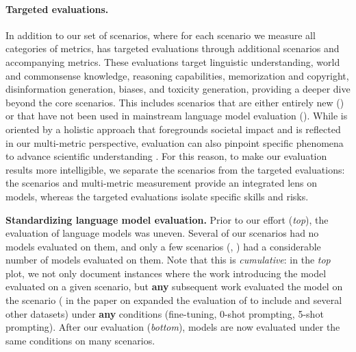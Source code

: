 \paragraph{Targeted evaluations.}
In addition to our \core set of \numcorescenarios scenarios, where for each scenario we measure all \nummetriccategories categories of metrics, \benchmarkname has \numcomponents targeted evaluations through \numcomponentscenarios additional scenarios and accompanying metrics.
These evaluations target linguistic understanding, world and commonsense knowledge, reasoning capabilities, memorization and copyright, disinformation generation, biases, and toxicity generation, providing a deeper dive beyond the core scenarios.
This includes \numnewscenarios scenarios that are either entirely new (\eg \wikifact) or that have not been used in mainstream language model evaluation (\eg \ice).
While \benchmarkname is oriented by a holistic approach that foregrounds societal impact and is reflected in our multi-metric perspective, evaluation can also pinpoint specific phenomena to advance scientific understanding \citep[\eg a model's ability to perform analogical reasoning; see][\S4.4]{bommasani2021opportunities}. 
For this reason, to make our evaluation results more intelligible, we separate the \core scenarios from the targeted evaluations: the \core scenarios and multi-metric measurement provide an integrated lens on models, whereas the targeted evaluations isolate specific skills and risks.

{\textbf{Standardizing language model evaluation.} Prior to our effort (\textit{top}), the evaluation of language models was uneven.
Several of our \numcorescenarios \core scenarios had no models evaluated on them, and only a few scenarios (\eg \boolq, \hellaswag) had a considerable number of models evaluated on them. 
Note that this is \textit{cumulative}: in the \textit{top} plot, we not only document instances where the work introducing the model evaluated on a given scenario, but \textbf{any} subsequent work evaluated the model on the scenario (\eg \citet{tay2022unifying} in the paper on \ultwo expanded the evaluation of \tfive to include \hellaswag and several other datasets) under \textbf{any} conditions (\eg fine-tuning, 0-shot prompting, 5-shot prompting).
After our evaluation (\textit{bottom}), models are now evaluated under the same conditions on many scenarios.
}

